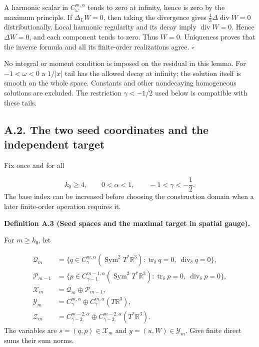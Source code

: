 \documentclass[
  english,
  11pt,
  reqno]{amsart}
\makeatletter
\newcommand{\pandocstatementheading}[1]{%
  \par\addpenalty{\@beginparpenalty}%
  \addvspace{.5\baselineskip plus .2\baselineskip minus .2\baselineskip}%
  {\normalfont\bfseries #1\par}%
  \nobreak\@afterindenttrue\@afterheading
}
\makeatother
\begin{document}
A harmonic scalar in \(C^{m,\alpha}_\omega\) tends to zero at infinity,
hence is zero by the maximum principle. If \(\Delta_LW=0\), then taking
the divergence gives \(\frac43\Delta\operatorname{div}W=0\)
distributionally. Local harmonic regularity and its decay imply
\(\operatorname{div}W=0\). Hence \(\Delta W=0\), and each component
tends to zero. Thus \(W=0\). Uniqueness proves that the inverse formula
and all its finite-order realizations agree. \hfill\(\square\)

No integral or moment condition is imposed on the residual in this
lemma. For \(-1<\omega<0\) a \(1/|x|\) tail has the allowed decay at
infinity; the solution itself is smooth on the whole space. Constants
and other nondecaying homogeneous solutions are excluded. The
restriction \(\gamma<-1/2\) used below is compatible with these tails.

\subsection{A.2. The two seed coordinates and the independent
target}\label{a.2.-the-two-seed-coordinates-and-the-independent-target}\label{sec:online-chart-ambient-coordinates}

Fix once and for all

\label{eq:online-chart-base-indices} \[
k_0\ge4,\qquad 0<\alpha<1,\qquad -1<\gamma<-\frac12.
\] The base index can be increased before choosing the construction
domain when a later finite-order operation requires it.

\pandocstatementheading{\leavevmode{}\label{def:online-chart-seeds-and-target}Definition A.3 (Seed spaces and the maximal target in spatial gauge).}

For \(m\ge k_0\), let

\label{eq:online-chart-seed-correction-residual-spaces}
\[
\begin{aligned}
\mathcal Q_m
&=\{q\in C^{m,\alpha}_\gamma(\operatorname{Sym}^2T^*\mathbb R^3):
\operatorname{tr}_\delta q=0,\ 
\operatorname{div}_\delta q=0\},\\
\mathcal P_{m-1}
&=\{p\in C^{m-1,\alpha}_{\gamma-1}(\operatorname{Sym}^2T^*\mathbb R^3):
\operatorname{tr}_\delta p=0,\
\operatorname{div}_\delta p=0\},\\
\mathcal X_m&=\mathcal Q_m\oplus\mathcal P_{m-1},\\
\mathcal Y_m&=C^{m,\alpha}_\gamma
\oplus C^{m,\alpha}_\gamma(T\mathbb R^3),\\
\mathcal Z_m&=C^{m-2,\alpha}_{\gamma-2}
\oplus C^{m-2,\alpha}_{\gamma-2}(T^*\mathbb R^3).
\end{aligned}
\] The variables are \(s=(q,p)\in\mathcal X_m\) and
\(y=(u,W)\in\mathcal Y_m\). Give finite direct sums their sum norms.
\end{document}
